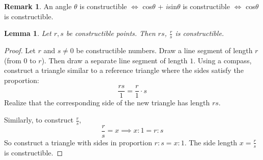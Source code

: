 \documentclass{article}
\theoremstyle{plain}
\newtheorem{lem}{Lemma}
\theoremstyle{definition}
\newtheorem{rem}{Remark}
\begin{document}
\begin{rem}
    An angle $\theta$ is constructible $\iff$ cos$\theta$ + $i$sin$\theta$ is constructible $\iff$ cos$\theta$ is constructible.
\begin{center}
\end{center}
\end{rem}

\begin{lem}
    Let $r, s$ be constructible points. Then $rs$, $\frac{r}{s}$ is constructible.
\end{lem}

\begin{proof} Let $r$ and $s \neq 0$ be constructible numbers. Draw a line segment of length $r$ (from $0$ to $r$). Then draw a separate line segment of length $1$. Using a compass, construct a triangle similar to a reference triangle where the sides satisfy the proportion: \begin{equation}
    \frac{rs}{1} = \frac{r}{1} \cdot s
\end{equation} Realize that the corresponding side of the new triangle has length $rs$. \checkmark

Similarly, to construct $\frac{r}{s}$, \begin{equation}
    \frac{r}{s} = x \implies x:1 = r:s
\end{equation} So construct a triangle with sides in proportion $r:s = x:1$. The side length $x = \frac{r}{s}$ is constructible. \checkmark 
\end{proof} 
\end{document}

